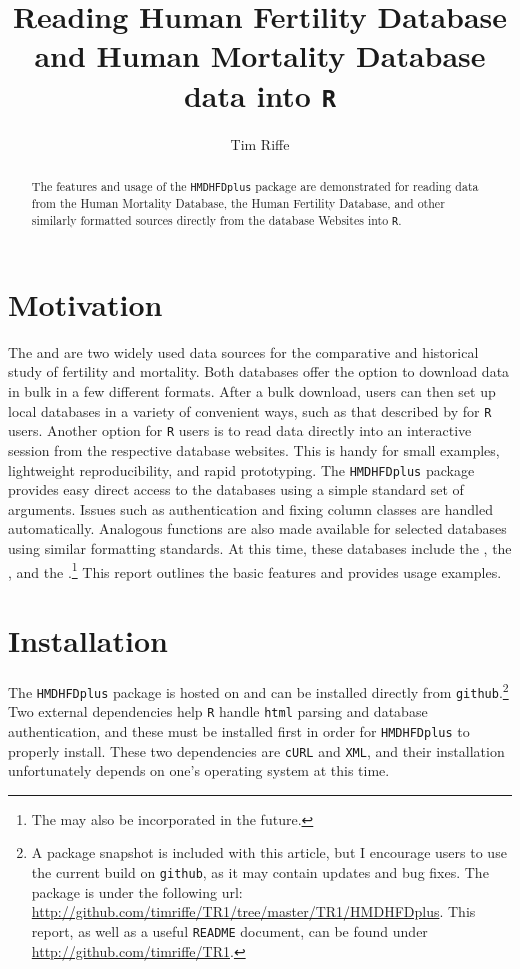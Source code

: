 \documentclass{article}
\begin{document}
\title{Reading Human Fertility Database and Human Mortality Database data into \texttt{R}}
\author{Tim Riffe}
\maketitle
\begin{abstract}
The features and usage of the \texttt{HMDHFDplus} package are demonstrated for
reading data from the Human Mortality Database, the Human Fertility Database,
and other similarly formatted sources directly from the database Websites into
\texttt{R}.
\end{abstract}

\section{Motivation}
The \citet{HFD} and \citet{HMD} are two widely used data sources
for the comparative and historical study of fertility and mortality. Both
databases offer the option to download data in bulk in a few different formats. After a bulk
download, users can then set up local databases in a variety of
convenient ways, such as that described by \citet{minton2015} for \texttt{R}
\citep{Rcitation} users. Another option for \texttt{R} users is to read data
directly into an interactive session from the respective database websites. This
is handy for small examples, lightweight reproducibility, and rapid
prototyping.
The \texttt{HMDHFDplus} package provides easy direct access to the databases using a simple standard set of arguments. Issues such as authentication and fixing column classes are handled
automatically. Analogous functions are also made
available for selected databases using similar formatting standards. At this
time, these databases include the \citet{JMD}, the \citet{CHMD}, and the
\citet{HFC}.\footnote{The \citet{HLD} may also be
incorporated in the future.} This report outlines the basic features and provides usage
examples.

\section{Installation}
The \texttt{HMDHFDplus} package is hosted on and can be installed
directly from \texttt{github}.\footnote{A package snapshot is included with
this article, but I encourage users to use the current build on
\texttt{github}, as it may contain updates and bug fixes. The package is under
the following url:
\url{http://github.com/timriffe/TR1/tree/master/TR1/HMDHFDplus}. This report,
as well as a useful \texttt{README} document, can be found under
\url{http://github.com/timriffe/TR1}.} Two external dependencies help \texttt{R}
handle \texttt{html} parsing and database authentication, and these must be installed first in order for \texttt{HMDHFDplus} to properly install.
These two dependencies are \texttt{cURL} and \texttt{XML}, and their
installation unfortunately depends on one's operating system at this time.
\end{document}
